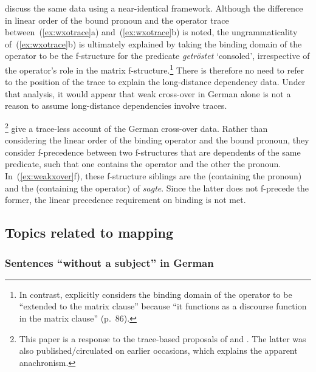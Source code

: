 \documentclass[output=paper,hidelinks]{langscibook}
\begin{document}
\citet[§9.5]{BresnanEtAl2016} discuss the same data using a near-identical framework. Although the difference in linear order of the
bound pronoun and the operator trace between~(\ref{ex:wxotrace}a) and~(\ref{ex:wxotrace}b)
is noted, the ungrammaticality of~(\ref{ex:wxotrace}b) is ultimately explained
by taking the binding domain of the operator to be the f-structure for
the predicate \textit{getröstet} `consoled', irrespective of the
operator's \DF role in the matrix f-structure.\footnote{In contrast,
\citet[§5.2.6]{Berman2003} explicitly considers the binding domain of
the operator to be ``extended to the matrix clause'' because ``it
functions as a discourse function in the matrix clause'' (p.~86).} There
is therefore no need to refer to the position of the trace to explain
the long-distance dependency data. Under that analysis, it would
appear that weak cross-over in German alone is not a reason to assume
long-distance dependencies involve traces.

\citet{dalrympleetal2001}\footnote{This paper is a response to
the trace-based proposals of
\citet{Bresnan1998} and \citet{Berman2003}. The latter was also
published/circulated on earlier occasions, which explains the apparent
anachronism.} give a trace-less account of the German cross-over
data. Rather than considering the linear order of the binding operator
and the bound pronoun, they consider f-precedence between two
f-structures that are dependents of the same predicate, such that one
contains the operator and the other the pronoun. In~(\ref{ex:weakxover}f), these
f-structure siblings are the \SUBJ (containing the pronoun) and the
\COMP (containing the operator) of \textit{sagte}. Since the latter
does not f-precede the former, the linear precedence requirement on
binding is not met.

\subsection{Topics related to mapping\label{sec:Germanic:mapping}}

\subsubsection{Sentences ``without a subject'' in German\label{sec:Germanic:subjectless}}
\end{document}
